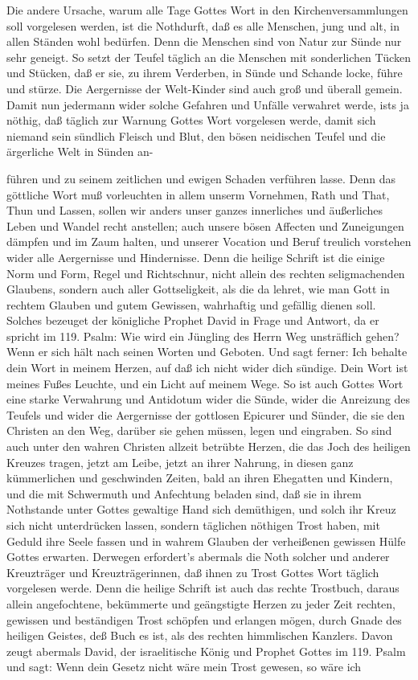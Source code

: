Die andere Ursache, warum alle Tage Gottes Wort in den Kirchenversammlungen soll vorgelesen werden, ist die Nothdurft, daß es alle Menschen, jung und alt, in allen Ständen wohl bedürfen. Denn die Menschen sind von Natur zur Sünde nur sehr geneigt. So setzt der Teufel täglich an die Menschen mit sonderlichen Tücken und Stücken, daß er sie, zu ihrem Verderben, in Sünde und Schande locke, führe und stürze. Die Aergernisse der Welt-Kinder sind auch groß und überall gemein. Damit nun jedermann wider solche Gefahren und Unfälle verwahret werde, ists ja nöthig, daß täglich zur Warnung Gottes Wort vorgelesen werde, damit sich niemand sein sündlich Fleisch und Blut, den bösen neidischen Teufel und die ärgerliche Welt in Sünden an-


führen und zu seinem zeitlichen und ewigen Schaden verführen lasse. Denn das göttliche Wort muß vorleuchten in allem unserm Vornehmen, Rath und That, Thun und Lassen, sollen wir anders unser ganzes innerliches und äußerliches Leben und Wandel recht anstellen; auch unsere bösen Affecten und Zuneigungen dämpfen und im Zaum halten, und unserer Vocation und Beruf treulich vorstehen wider alle Aergernisse und Hindernisse. Denn die heilige Schrift ist die einige Norm und Form, Regel und Richtschnur, nicht allein des rechten seligmachenden Glaubens, sondern auch aller Gottseligkeit, als die da lehret, wie man Gott in rechtem Glauben und gutem Gewissen, wahrhaftig und gefällig dienen soll. Solches bezeuget der königliche Prophet David in Frage und Antwort, da er spricht im 119. Psalm: Wie wird ein Jüngling des Herrn Weg unsträflich gehen? Wenn er sich hält nach seinen Worten und Geboten. Und sagt ferner: Ich behalte dein Wort in meinem Herzen, auf daß ich nicht wider dich sündige. Dein Wort ist meines Fußes Leuchte, und ein Licht auf meinem Wege. So ist auch Gottes Wort eine starke Verwahrung und Antidotum wider die Sünde, wider die Anreizung des Teufels und wider die Aergernisse der gottlosen Epicurer und Sünder, die sie den Christen an den Weg, darüber sie gehen müssen, legen und eingraben. So sind auch unter den wahren Christen allzeit betrübte Herzen, die das Joch des heiligen Kreuzes tragen, jetzt am Leibe, jetzt an ihrer Nahrung, in diesen ganz kümmerlichen und geschwinden Zeiten, bald an ihren Ehegatten und Kindern, und die mit Schwermuth und Anfechtung beladen sind, daß sie in ihrem Nothstande unter Gottes gewaltige Hand sich demüthigen, und solch ihr Kreuz sich nicht unterdrücken lassen, sondern täglichen nöthigen Trost haben, mit Geduld ihre Seele fassen und in wahrem Glauben der verheißenen gewissen Hülfe Gottes erwarten. Derwegen erfordert's abermals die Noth solcher und anderer Kreuzträger und Kreuzträgerinnen, daß ihnen zu Trost Gottes Wort täglich vorgelesen werde. Denn die heilige Schrift ist auch das rechte Trostbuch, daraus allein angefochtene, bekümmerte und geängstigte Herzen zu jeder Zeit rechten, gewissen und beständigen Trost schöpfen und erlangen mögen, durch Gnade des heiligen Geistes, deß Buch es ist, als des rechten himmlischen Kanzlers. Davon zeugt abermals David, der israelitische König und Prophet Gottes im 119. Psalm und sagt: Wenn dein Gesetz nicht wäre mein Trost gewesen, so wäre ich 